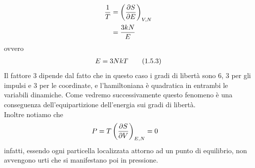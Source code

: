 \documentclass{article}
\begin{document}
\begin{align}
    \frac{1}{T} &= \left(\frac{\partial S}{\partial E}\right)_{V, N} \notag \\
    &= \frac{3kN}{E} \notag
\end{align}
ovvero
\begin{align}
    E = 3NkT \tag{1.5.3} \notag
\end{align}
Il fattore $3$ dipende dal fatto che in questo caso i gradi di libertà sono $6$, $3$ per gli impulsi e $3$ per le coordinate, e l'hamiltoniana è quadratica in entrambi le variabili dinamiche. Come vedremo successivamente questo fenomeno è una conseguenza dell'equipartizione dell'energia sui gradi di libertà. \\
Inoltre notiamo che
\begin{align}
    P &= T\left(\frac{\partial S}{\partial V}\right)_{E, N} = 0 \notag
\end{align}
infatti, essendo ogni particella localizzata attorno ad un punto di equilibrio, non avvengono urti che si manifestano poi in pressione.

\newpage
\end{document}
